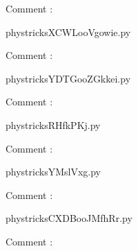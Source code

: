     Comment : 

    \clearpage
    


    \newcommand{\CaptionFigXCWLooVgowie}{<+Type your caption here+>}
    \begin{center}
        
    \end{center}
    phystricksXCWLooVgowie.py

    Comment : 

    \clearpage
    


    \newcommand{\CaptionFigYDTGooZGkkei}{<+Type your caption here+>}
    \begin{center}
        
    \end{center}
    phystricksYDTGooZGkkei.py

    Comment : 

    \clearpage
    


    \newcommand{\CaptionFigRHfkPKj}{<+Type your caption here+>}
    \begin{center}
        
    \end{center}
    phystricksRHfkPKj.py

    Comment : 

    \clearpage
    


    \newcommand{\CaptionFigYMslVxg}{<+Type your caption here+>}
    \begin{center}
        
    \end{center}
    phystricksYMslVxg.py

    Comment : 

    \clearpage
    


    \newcommand{\CaptionFigCXDBooJMfhRr}{<+Type your caption here+>}
    \begin{center}
        
    \end{center}
    phystricksCXDBooJMfhRr.py

    Comment : 

    \clearpage
    

